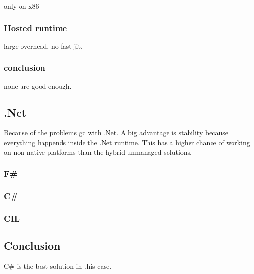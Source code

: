 only on x86\cite{mono_c++cli}

\subsubsection*{Hosted runtime}
large overhead, no fast jit.

\subsubsection*{conclusion}
none are good enough.


\subsection{.Net}
Because of the problems go with .Net.
A big advantage is stability because everything happends inside the .Net runtime.
This has a higher chance of working on non-native platforms than the hybrid unmanaged solutions.

\subsubsection*{F\#}
\subsubsection*{C\#}
\subsubsection*{CIL}


\subsection{Conclusion}
C\# is the best solution in this case.

